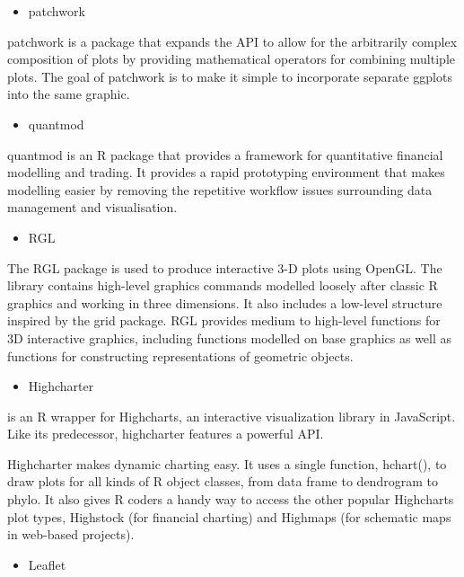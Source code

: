 \documentclass[
]{report}
\providecommand{\tightlist}{%
  \setlength{\itemsep}{0pt}\setlength{\parskip}{0pt}}
\begin{document}
\begin{itemize}
\tightlist
\item
  patchwork
\end{itemize}

patchwork is a package that expands the API to allow for the arbitrarily complex composition of plots by providing mathematical operators for combining multiple plots. The goal of patchwork is to make it simple to incorporate separate ggplots into the same graphic.

\begin{itemize}
\tightlist
\item
  quantmod
\end{itemize}

quantmod is an R package that provides a framework for quantitative financial modelling and trading. It provides a rapid prototyping environment that makes modelling easier by removing the repetitive workflow issues surrounding data management and visualisation.

\begin{itemize}
\tightlist
\item
  RGL
\end{itemize}

The RGL package is used to produce interactive 3-D plots using OpenGL. The library contains high-level graphics commands modelled loosely after classic R graphics and working in three dimensions. It also includes a low-level structure inspired by the grid package. RGL provides medium to high-level functions for 3D interactive graphics, including functions modelled on base graphics as well as functions for constructing representations of geometric objects.

\begin{itemize}
\tightlist
\item
  Highcharter
\end{itemize}

is an R wrapper for Highcharts, an interactive visualization library in JavaScript. Like its predecessor, highcharter features a powerful API.

Highcharter makes dynamic charting easy. It uses a single function, hchart(), to draw plots for all kinds of R object classes, from data frame to dendrogram to phylo. It also gives R coders a handy way to access the other popular Highcharts plot types, Highstock (for financial charting) and Highmaps (for schematic maps in web-based projects).

\begin{itemize}
\tightlist
\item
  Leaflet
\end{itemize}
\end{document}
